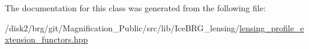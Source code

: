 The documentation for this class was generated from the following file\-:\begin{DoxyCompactItemize}
\item 
/disk2/brg/git/\-Magnification\-\_\-\-Public/src/lib/\-Ice\-B\-R\-G\-\_\-lensing/\hyperlink{lensing__profile__extension__functors_8hpp}{lensing\-\_\-profile\-\_\-extension\-\_\-functors.\-hpp}\end{DoxyCompactItemize}
